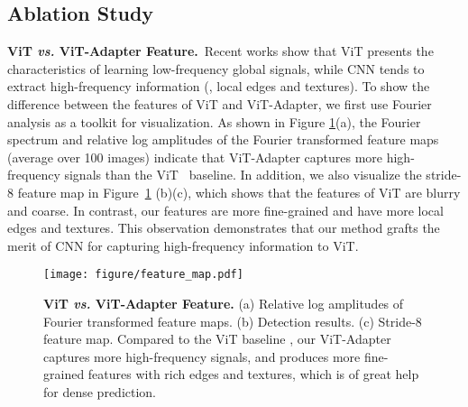 \documentclass{article} \usepackage{iclr2023_conference,times}
\begin{document}
\subsection{Ablation Study}
\label{sec:ablation}
\noindent\textbf{ViT \emph{vs.} ViT-Adapter Feature.}~Recent works \citep{park2022vision,si2022inception} show that ViT presents the characteristics of learning low-frequency global signals, while CNN tends to extract high-frequency information (\eg, local edges and textures).
To show the difference between the features of ViT and ViT-Adapter,
we first use Fourier analysis as a toolkit for visualization.
As shown in Figure \ref{fig:feature_map}(a), the Fourier spectrum and relative log amplitudes of the Fourier transformed feature maps (average over 100 images) indicate that ViT-Adapter captures more high-frequency signals than the ViT~\citep{li2021benchmarking} baseline.
In addition, we also visualize the stride-8 feature map in Figure~\ref{fig:feature_map} (b)(c), which shows that the features of ViT are blurry and coarse.
In contrast, our features are more fine-grained and have more local edges and textures.
This observation demonstrates that our method grafts the merit of CNN for capturing high-frequency information to ViT.

\begin{figure}[t]
    \centering
    \texttt{[image: figure/feature\_map.pdf]}
    \vspace{-0.5em}
    \caption{
        \textbf{ViT \emph{vs.} ViT-Adapter Feature.}
        (a) Relative log amplitudes of Fourier transformed feature maps.
        (b) Detection results.
        (c) Stride-8 feature map. 
        Compared to the ViT baseline \citep{li2021benchmarking}, our ViT-Adapter captures more high-frequency signals, and produces more fine-grained features with rich edges and textures, which is of great help for dense prediction.
        }
    \label{fig:feature_map}
\end{figure}
\end{document}
